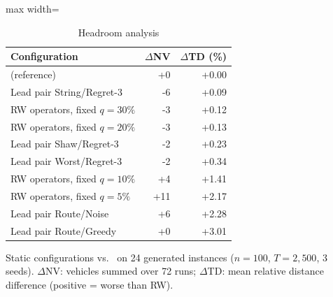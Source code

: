 \begin{table}[t]
\centering
\caption{Headroom analysis}\label{tab:headroom}
\begin{adjustbox}{max width=\linewidth}
\begin{tabular}{lrr}
\toprule
Configuration & $\Delta$NV & $\Delta$TD (\%)\\ \midrule
\Rw{} (reference) & +0 & +0.00\\
Lead pair String/Regret-3 & -6 & +0.09\\
RW operators, fixed $q=30\%$ & -3 & +0.12\\
RW operators, fixed $q=20\%$ & -3 & +0.13\\
Lead pair Shaw/Regret-3 & -2 & +0.23\\
Lead pair Worst/Regret-3 & -2 & +0.34\\
RW operators, fixed $q=10\%$ & +4 & +1.41\\
RW operators, fixed $q=5\%$ & +11 & +2.17\\
Lead pair Route/Noise & +6 & +2.28\\
Lead pair Route/Greedy & +0 & +3.01\\
\bottomrule
\end{tabular}
\end{adjustbox}
\par\vspace{2pt}\parbox{\linewidth}{\footnotesize Static configurations vs.\ \Rw{} on 24 generated instances ($n=100$, $T=2{,}500$, 3 seeds). $\Delta$NV: vehicles summed over 72 runs; $\Delta$TD: mean relative distance difference (positive = worse than RW).}
\end{table}
